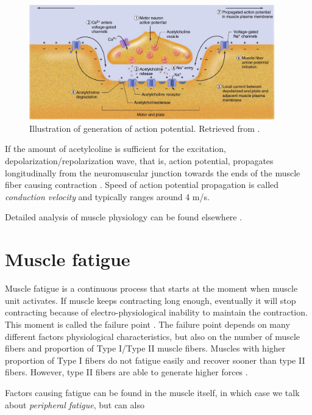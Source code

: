 \begin{figure}[ht]
\centering
\includegraphics[width=0.95\textwidth]{Images/introduction/action_potential_generation.png}
\caption{Illustration of generation of action potential. Retrieved from \citep{Widmaier2014}.}
\label{fig:action_potential_generation}
\end{figure}
  
If the amount of acetylcoline is sufficient for the excitation, depolarization/repolarization wave, that is, action potential, propagates longitudinally from the neuromuscular junction towards the ends of the muscle fiber causing contraction \citep{Henneberg1999}. Speed of action potential propagation is called \emph{conduction velocity} and typically ranges around 4 m/s.

Detailed analysis of muscle physiology can be found elsewhere \citep{Squire1986, Widmaier2014}.






\section{Muscle fatigue}

Muscle fatigue is a continuous process that starts at the moment when muscle unit activates. If muscle keeps contracting long enough, eventually it will stop contracting because of electro-physiological inability to maintain the contraction. This moment is called the failure point \citep{DeLuca1984}. The failure point depends on many different factors physiological characteristics, but also on the number of muscle fibers and proportion of Type I/Type II muscle fibers. Muscles with higher proportion of Type I fibers do not fatigue easily and recover sooner than type II fibers. However, type II fibers are able to generate higher forces \citep{Kupa1995}.

Factors causing fatigue can be found in the muscle itself, in which case we talk about \emph{peripheral fatigue}, but can also 

